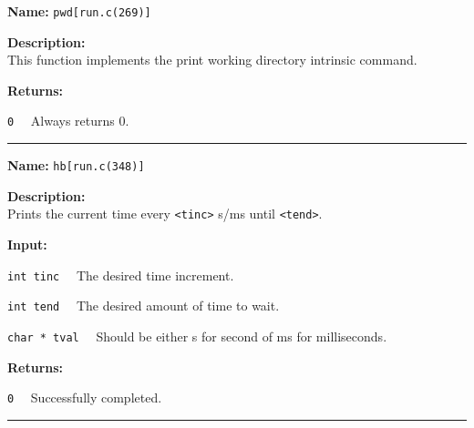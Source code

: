 \documentclass[11pt,a4paper]{article}
\begin{document}
\begin{description}
\item \textbf{Name:} 
\verb|pwd[run.c(269)]|

\item \textbf{Description:}\\
This function implements the print working directory intrinsic command.

\item \textbf{Returns:}
\begin{description}
\item \verb|0|~~ Always returns 0.
\end{description}
\end{description}\hrule

\begin{description}
\item \textbf{Name:} 
\verb|hb[run.c(348)]|

\item \textbf{Description:}\\
Prints the current time every \verb|<tinc>| s/ms until \verb|<tend>|.

\item \textbf{Input:}
\begin{description}
\item \verb|int tinc|~~ The desired time increment.
\item \verb|int tend|~~ The desired amount of time to wait.
\item \verb|char * tval|~~ Should be either s for second of ms for milliseconds.
\end{description}

\item \textbf{Returns:}
\begin{description}
\item \verb|0|~~ Successfully completed.
\end{description}
\end{description}\hrule
\end{document}
